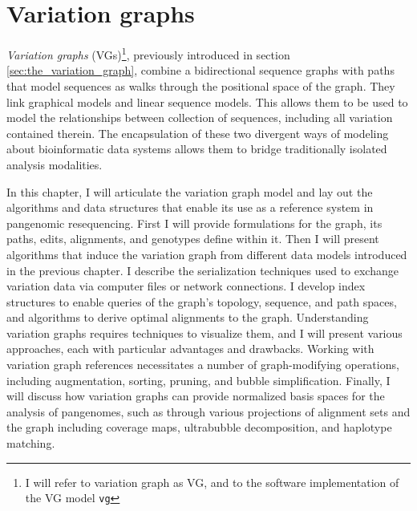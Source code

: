 
\chapter{Variation graphs}

\label{chapter:variation_graphs}

\ifpdf
    \graphicspath{{Chapter2/Figs/Raster/}{Chapter2/Figs/PDF/}{Chapter2/Figs/}}
\else
    \graphicspath{{Chapter2/Figs/Vector/}{Chapter2/Figs/}}
\fi

\emph{Variation graphs} (VGs)\footnote{I will refer to variation graph as VG, and to the software implementation of the VG model {\tt vg}}, previously introduced in section \ref{sec:the_variation_graph}, combine a bidirectional sequence graphs with paths that model sequences as walks through the positional space of the graph.
They link graphical models and linear sequence models.
This allows them to be used to model the relationships between collection of sequences, including all variation contained therein.
The encapsulation of these two divergent ways of modeling about bioinformatic data systems allows them to bridge traditionally isolated analysis modalities.

In this chapter, I will articulate the variation graph model and lay out the algorithms and data structures that enable its use as a reference system in pangenomic resequencing.
First I will provide formulations for the graph, its paths, edits, alignments, and genotypes define within it.
Then I will present algorithms that induce the variation graph from different data models introduced in the previous chapter.
I describe the serialization techniques used to exchange variation data via computer files or network connections.
I develop index structures to enable queries of the graph's topology, sequence, and path spaces, and algorithms to derive optimal alignments to the graph.
Understanding variation graphs requires techniques to visualize them, and I will present various approaches, each with particular advantages and drawbacks.
Working with variation graph references necessitates a number of graph-modifying operations, including augmentation, sorting, pruning, and bubble simplification.
Finally, I will discuss how variation graphs can provide normalized basis spaces for the analysis of pangenomes, such as through various projections of alignment sets and the graph including coverage maps, ultrabubble decomposition, and haplotype matching.

